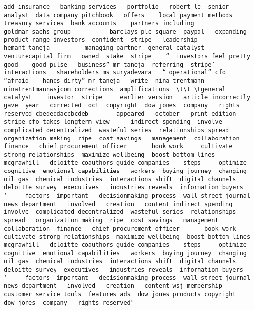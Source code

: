 \documentclass[
]{article}
\begin{document}
\begin{verbatim}
add insurance   banking services   portfolio   robert le  senior analyst  data company pitchbook   offers    local payment methods    treasury services  bank accounts    partners including                       goldman sachs group           barclays plc square  paypal   expanding  product range investors  confident  stripe   leadership                        hemant taneja          managing partner  general catalyst  venturecapital firm   owned  stake  stripe    “  investors feel pretty good    good pulse   business” mr taneja  referring  stripe’ interactions   shareholders ms suryadevara   “ operational” cfo   “afraid    hands dirty” mr taneja   write  nina trentmann  ninatrentmannwsjcom corrections  amplifications  \t\t \tgeneral catalyst    investor  stripe     earlier version   article incorrectly gave  year   corrected  oct  copyright  dow jones  company   rights reserved cbededdaccbcdeb        appeared   october   print edition  stripe cfo takes longterm view      indirect spending  involve  complicated decentralized  wasteful series  relationships spread   organization making  ripe  cost savings   management  collaboration  finance   chief procurement officer       book work     cultivate strong relationships  maximize wellbeing  boost bottom lines mcgrawhill   deloitte coauthors guide companies    steps     optimize  cognitive  emotional capabilities   workers  buying journey  changing   oil gas  chemical industries  interactions shift  digital channels  deloitte survey  executives   industries reveals  information buyers   ’     factors  important   decisionmaking process  wall street journal news department   involved   creation   content indirect spending  involve  complicated decentralized  wasteful series  relationships spread   organization making  ripe  cost savings   management  collaboration  finance   chief procurement officer       book work     cultivate strong relationships  maximize wellbeing  boost bottom lines mcgrawhill   deloitte coauthors guide companies    steps     optimize  cognitive  emotional capabilities   workers  buying journey  changing   oil gas  chemical industries  interactions shift  digital channels  deloitte survey  executives   industries reveals  information buyers   ’     factors  important   decisionmaking process  wall street journal news department   involved   creation   content wsj membership customer service tools  features ads  dow jones products copyright   dow jones  company   rights reserved"                                                                                                                                                                                                                                                                                                                                                                                                                                                                                                                                                                                                                                                                                                                                                                                                                                                              
\end{verbatim}
\end{document}
